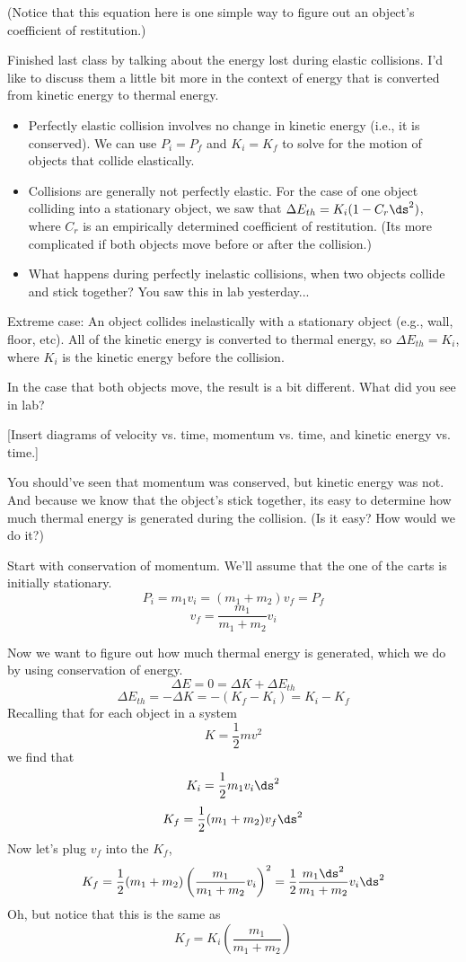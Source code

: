 (Notice that this equation here is one simple way to figure out an object's coefficient of restitution.)


Finished last class by talking about the energy lost during elastic collisions. I'd like to discuss them a little bit more in the context of energy that is converted from kinetic energy to thermal energy.
\begin{itemize}
\item Perfectly elastic collision involves no change in kinetic energy (i.e., it is conserved). We can use $P_i=P_f$ and $K_i=K_f$ to solve for the motion of objects that collide elastically.
\item Collisions are generally not perfectly elastic. For the case of one object colliding into a stationary object, we saw that $\Delta{E_{th}}=K_i(1-C_r\ds^2)$, where $C_r$ is an empirically determined coefficient of restitution. (Its more complicated if both objects move before or after the collision.)
\item What happens during perfectly inelastic collisions, when two objects collide and stick together? You saw this in lab yesterday...
\end{itemize}

Extreme case: An object collides inelastically with a stationary object (e.g., wall, floor, etc). All of the kinetic energy is converted to thermal energy, so $\Delta{E_{th}}=K_i$, where $K_i$ is the kinetic energy before the collision. 

In the case that both objects move, the result is a bit different. What did you see in lab?

[Insert diagrams of velocity vs. time, momentum vs. time, and kinetic energy vs. time.]

You should've seen that momentum was conserved, but kinetic energy was not. And because we know that the object's stick together, its easy to determine how much thermal energy is generated during the collision. (Is it easy? How would we do it?)

Start with conservation of momentum. We'll assume that the one of the carts is initially stationary.
$$P_i=m_1v_i=(m_1+m_2)v_f=P_f$$
$$v_f=\frac{m_1}{m_1+m_2}v_i$$

Now we want to figure out how much thermal energy is generated, which we do by using conservation of energy.
$$\Delta{E}=0=\Delta{K}+\Delta{E_{th}}$$
$$\Delta{E_{th}}=-\Delta{K}=-(K_f-K_i)=K_i-K_f$$
Recalling that for each object in a system
$$K=\frac{1}{2}mv^2$$
we find that 
$$K_i=\frac{1}{2}m_1v_i\ds^2$$
$$K_f=\frac{1}{2}(m_1+m_2)v_f\ds^2$$
Now let's plug $v_f$ into the $K_f$,
$$K_f=\frac{1}{2}(m_1+m_2)\left(\frac{m_1}{m_1+m_2}v_i\right)^2=\frac{1}{2}\frac{m_1\ds^2}{m_1+m_2}v_i\ds^2$$
Oh, but notice that this is the same as
$$K_f=K_i\left(\frac{m_1}{m_1+m_2}\right)$$

